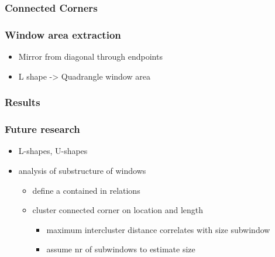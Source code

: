 \documentclass{beamer}
\begin{document}
\frame
{
	\frametitle{Connected Corners}

}

\frame
{
	\frametitle{Window area extraction}
	\begin{itemize}
	\item <+-| alert@+> Mirror from diagonal through endpoints
	\item <+-| alert@+> L shape -> Quadrangle window area
	\end{itemize}
}

\frame
{
	\frametitle{Results}
}

\frame
{
	\frametitle{Future research}
	\begin{itemize}
	\item <+-| alert@+> L-shapes, U-shapes
	\item <+-| alert@+> analysis of substructure of windows
	\begin{itemize}
		\item <+-| alert@+> define a contained in relations
		\item <+-| alert@+> cluster connected corner on location and length
		\begin{itemize}
			\item <+-| alert@+> maximum intercluster distance correlates with size subwindow
			\item <+-| alert@+> assume nr of subwindows to estimate size
		\end{itemize}
	\end{itemize}
	\end{itemize}
}
\end{document}
